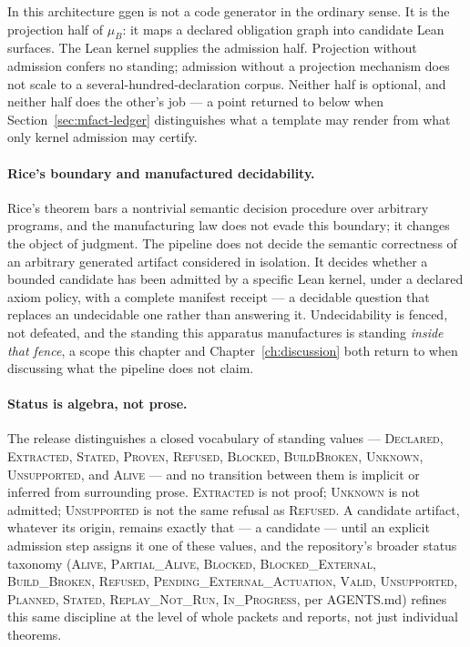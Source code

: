 \begin{table}[h]
\centering

\caption{Current release standing, rendered from the manifest via \texttt{final\_status.tex}.}
\label{tab:mfact-final-status}
\end{table}

In this architecture ggen is not a code generator in the ordinary sense.
It is the projection half of $\mu_B$: it maps a declared obligation
graph into candidate Lean surfaces. The Lean kernel supplies the
admission half. Projection without admission confers no standing;
admission without a projection mechanism does not scale to a
several-hundred-declaration corpus. Neither half is optional, and
neither half does the other's job --- a point returned to below when
Section~\ref{sec:mfact-ledger} distinguishes what a template may render
from what only kernel admission may certify.

\paragraph{Rice's boundary and manufactured decidability.} Rice's
theorem bars a nontrivial semantic decision procedure over arbitrary
programs, and the manufacturing law does not evade this boundary; it
changes the object of judgment. The pipeline does not decide the
semantic correctness of an arbitrary generated artifact considered in
isolation. It decides whether a bounded candidate has been admitted by a
specific Lean kernel, under a declared axiom policy, with a complete
manifest receipt --- a decidable question that replaces an undecidable
one rather than answering it. Undecidability is fenced, not defeated,
and the standing this apparatus manufactures is standing \emph{inside
that fence}, a scope this chapter and Chapter~\ref{ch:discussion} both
return to when discussing what the pipeline does not claim.

\paragraph{Status is algebra, not prose.} The release distinguishes a
closed vocabulary of standing values --- \textsc{Declared},
\textsc{Extracted}, \textsc{Stated}, \textsc{Proven}, \textsc{Refused},
\textsc{Blocked}, \textsc{BuildBroken}, \textsc{Unknown},
\textsc{Unsupported}, and \textsc{Alive} --- and no transition between
them is implicit or inferred from surrounding prose. \textsc{Extracted}
is not proof; \textsc{Unknown} is not admitted; \textsc{Unsupported} is
not the same refusal as \textsc{Refused}. A candidate artifact, whatever
its origin, remains exactly that --- a candidate --- until an explicit
admission step assigns it one of these values, and the repository's
broader status taxonomy (\textsc{Alive}, \textsc{Partial\_Alive},
\textsc{Blocked}, \textsc{Blocked\_External}, \textsc{Build\_Broken},
\textsc{Refused}, \textsc{Pending\_External\_Actuation}, \textsc{Valid},
\textsc{Unsupported}, \textsc{Planned}, \textsc{Stated},
\textsc{Replay\_Not\_Run}, \textsc{In\_Progress}, per AGENTS.md) refines
this same discipline at the level of whole packets and reports, not just
individual theorems.

